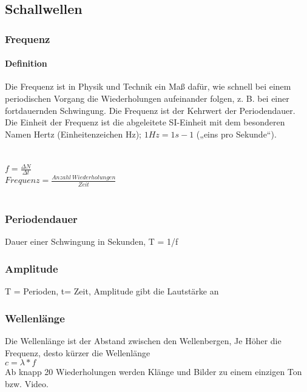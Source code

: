\subsection{Schallwellen}


    \subsubsection{Frequenz}
                \paragraph{Definition} 
                    Die Frequenz ist in Physik und Technik ein Maß dafür, wie schnell bei einem periodischen Vorgang die Wiederholungen aufeinander folgen, z. B. bei einer fortdauernden Schwingung. Die Frequenz ist der Kehrwert der Periodendauer.\\Die Einheit der Frequenz ist die abgeleitete SI-Einheit mit dem besonderen Namen Hertz (Einheitenzeichen  Hz); $1 Hz = 1 s-1$ („eins pro Sekunde“). \\~\\~\\
    $f=\frac{\Delta N}{\Delta t}$\\
    $Frequenz=\frac{Anzahl~Wiederholungen}{Zeit}$
    \\~\\

    
    \subsubsection{Periodendauer}
        Dauer einer Schwingung in Sekunden, T = 1/f



    \subsubsection{Amplitude}
        T = Perioden, t= Zeit, Amplitude gibt die Lautstärke an


    \subsubsection{Wellenlänge}
    Die Wellenlänge ist der Abstand zwischen den Wellenbergen, Je Höher die Frequenz, desto kürzer die Wellenlänge\\
 $c=\lambda*f$\\

Ab knapp 20 Wiederholungen werden Klänge und Bilder zu einem einzigen Ton bzw. Video.

